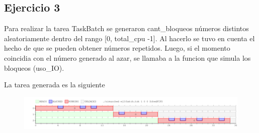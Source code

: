 \subsection{Ejercicio 3}

Para realizar la tarea TaskBatch se generaron cant_bloqueos números distintos aleatoriamente dentro del rango [0, total_cpu -1]. Al hacerlo se tuvo en cuenta el hecho de que se pueden obtener números repetidos.
Luego, si el momento coincidia con el número generado al azar, se llamaba a la funcion que simula los bloqueos (uso_IO).

La tarea generada es la siguiente

\begin{figure}[h]
  \includegraphics[width=\textwidth]{../ej3/salida.png}
  \caption{}
\end{figure}
